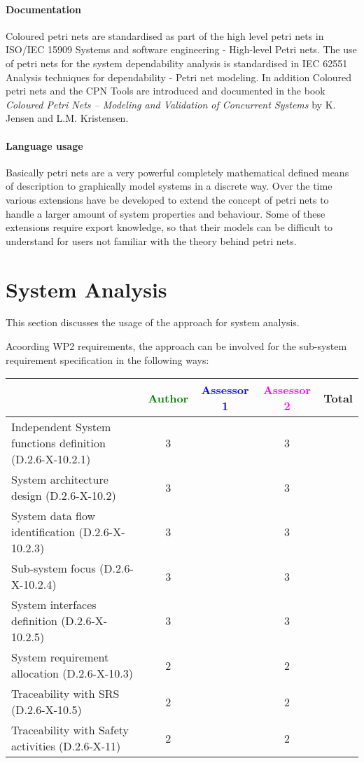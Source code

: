 \paragraph{Documentation} Coloured petri nets are standardised as part of the high level petri nets in ISO/IEC 15909 Systems and software engineering - High-level Petri nets. The use of petri nets for the system dependability analysis is standardised in IEC 62551 Analysis techniques for dependability - Petri net modeling. In addition Coloured petri nets and the CPN Tools are introduced and documented in the book \textit{Coloured Petri Nets -- Modeling and Validation of Concurrent Systems} by K. Jensen and L.M. Kristensen. 

\paragraph{Language usage} Basically petri nets are a very powerful completely mathematical defined means of description to graphically model systems in a discrete way. Over the time various extensions have be developed to extend the concept of petri nets to handle a larger amount of system properties and  behaviour. Some of these extensions require export knowledge, so that their models can be difficult to understand for users not familiar with the theory behind petri nets.

\section{System Analysis}
This section discusses the usage of the approach for system analysis.

Acoording WP2 requirements, the approach can be involved for the sub-system requirement specification in the following ways:

\begin{tabular}{|l | c | c | c | c|}
\hline
& \textcolor{green}{Author} & \textcolor{blue}{Assessor 1} & \textcolor{magenta}{Assessor 2} & Total \\
\hline
Independent System functions definition (D.2.6-X-10.2.1)  & 3 & & 3 &  \\
\hline 
System architecture design (D.2.6-X-10.2) & 3 & & 3 &  \\
\hline
System data flow identification (D.2.6-X-10.2.3)  & 3 & & 3 &  \\
\hline
Sub-system focus (D.2.6-X-10.2.4)  & 3 & & 3 &  \\
\hline
System interfaces definition (D.2.6-X-10.2.5)  & 3 & & 3 &  \\
\hline
System requirement allocation (D.2.6-X-10.3)  & 2 & & 2 &  \\
\hline
Traceability with SRS (D.2.6-X-10.5)  & 2 & & 2 &  \\
\hline
Traceability with Safety activities (D.2.6-X-11)  & 2 & & 2 &  \\
\hline
\end{tabular}



